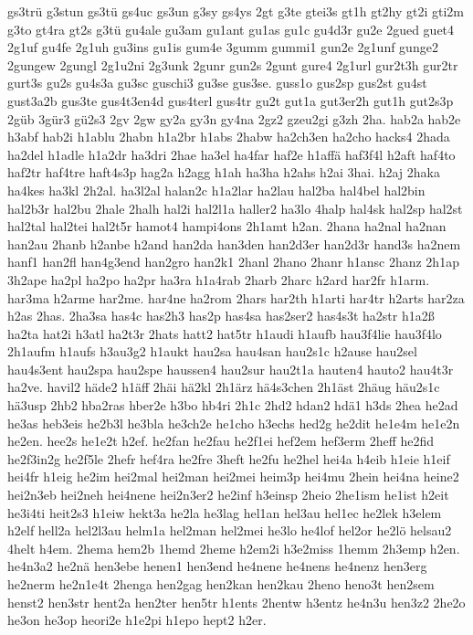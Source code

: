 {gs3trü
g3stun
gs3tü
gs4uc
gs3un
g3sy
gs4ys
2gt
g3te
gtei3s
gt1h
gt2hy
gt2i
gti2m
g3to
gt4ra
gt2s
g3tü
gu4ale
gu3am
gu1ant
gu1as
gu1c
gu4d3r
gu2e
2gued
guet4
2g1uf
gu4fe
2g1uh
gu3ins
gu1is
gum4e
3gumm
gummi1
gun2e
2g1unf
gunge2
2gungew
2gungl
2g1u2ni
2g3unk
2gunr
gun2s
2gunt
gure4
2g1url
gur2t3h
gur2tr
gurt3s
gu2s
gu4s3a
gu3sc
guschi3
gu3se
gus3se.
guss1o
gus2sp
gus2st
gu4st
gust3a2b
gus3te
gus4t3en4d
gus4terl
gus4tr
gu2t
gut1a
gut3er2h
gut1h
gut2s3p
2güb
3gür3
gü2s3
2gv
2gw
gy2a
gy3n
gy4na
2gz2
gzeu2gi
g3zh
2ha.
hab2a
hab2e
h3abf
hab2i
h1ablu
2habn
h1a2br
h1abs
2habw
ha2ch3en
ha2cho
hacks4
2hada
ha2del
h1adle
h1a2dr
ha3dri
2hae
ha3el
ha4far
haf2e
h1affä
haf3f4l
h2aft
haf4to
haf2tr
haf4tre
haft4s3p
hag2a
h2agg
h1ah
ha3ha
h2ahs
h2ai
3hai.
h2aj
2haka
ha4kes
ha3kl
2h2al.
ha3l2al
halan2c
h1a2lar
ha2lau
hal2ba
hal4bel
hal2bin
hal2b3r
hal2bu
2hale
2halh
hal2i
hal2l1a
haller2
ha3lo
4halp
hal4sk
hal2sp
hal2st
hal2tal
hal2tei
hal2t5r
hamot4
hampi4ons
2h1amt
h2an.
2hana
ha2nal
ha2nan
han2au
2hanb
h2anbe
h2and
han2da
han3den
han2d3er
han2d3r
hand3s
ha2nem
hanf1
han2fl
han4g3end
han2gro
han2k1
2hanl
2hano
2hanr
h1ansc
2hanz
2h1ap
3h2ape
ha2pl
ha2po
ha2pr
ha3ra
h1a4rab
2harb
2harc
h2ard
har2fr
h1arm.
har3ma
h2arme
har2me.
har4ne
ha2rom
2hars
har2th
h1arti
har4tr
h2arts
har2za
h2as
2has.
2ha3sa
has4c
has2h3
has2p
has4sa
has2ser2
has4s3t
ha2str
h1a2ß
ha2ta
hat2i
h3atl
ha2t3r
2hats
hatt2
hat5tr
h1audi
h1aufb
hau3f4lie
hau3f4lo
2h1aufm
h1aufs
h3au3g2
h1aukt
hau2sa
hau4san
hau2s1c
h2ause
hau2sel
hau4s3ent
hau2spa
hau2spe
haussen4
hau2sur
hau2t1a
hauten4
hauto2
hau4t3r
ha2ve.
havil2
häde2
h1äff
2häi
hä2kl
2h1ärz
hä4s3chen
2h1äst
2häug
häu2s1c
hä3usp
2hb2
hba2ras
hber2e
h3bo
hb4ri
2h1c
2hd2
hdan2
hdä1
h3ds
2hea
he2ad
he3as
heb3eis
he2b3l
he3bla
he3ch2e
he1cho
h3echs
hed2g
he2dit
he1e4m
he1e2n
he2en.
hee2s
he1e2t
h2ef.
he2fan
he2fau
he2f1ei
hef2em
hef3erm
2heff
he2fid
he2f3in2g
he2f5le
2hefr
hef4ra
he2fre
3heft
he2fu
he2hel
hei4a
h4eib
h1eie
h1eif
hei4fr
h1eig
he2im
hei2mal
hei2man
hei2mei
heim3p
hei4mu
2hein
hei4na
heine2
hei2n3eb
hei2neh
hei4nene
hei2n3er2
he2inf
h3einsp
2heio
2he1ism
he1ist
h2eit
he3i4ti
heit2s3
h1eiw
hekt3a
he2la
he3lag
hel1an
hel3au
hel1ec
he2lek
h3elem
h2elf
hell2a
hel2l3au
helm1a
hel2man
hel2mei
he3lo
he4lof
hel2or
he2lö
helsau2
4helt
h4em.
2hema
hem2b
1hemd
2heme
h2em2i
h3e2miss
1hemm
2h3emp
h2en.
he4n3a2
he2nä
hen3ebe
henen1
hen3end
he4nene
he4nens
he4nenz
hen3erg
he2nerm
he2n1e4t
2henga
hen2gag
hen2kan
hen2kau
2heno
heno3t
hen2sem
henst2
hen3str
hent2a
hen2ter
hen5tr
h1ents
2hentw
h3entz
he4n3u
hen3z2
2he2o
he3on
he3op
heori2e
h1e2pi
h1epo
hept2
h2er.
}
